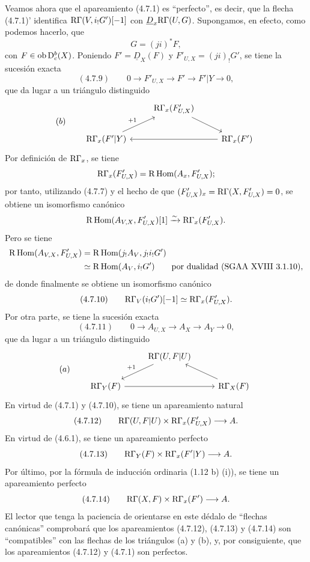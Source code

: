 Veamos ahora que el apareamiento (4.7.1) es \textquotedblleft perfecto\textquotedblright{}, es decir, que la flecha (4.7.1)' identifica $\mathrm{R}\Gamma(V,i_!G')[-1]$ con $\underline{D}_x\mathrm{R}\Gamma(U,G)$. Supongamos, en efecto, como podemos hacerlo, que
\[
G=(ji)^*F,
\]
con $F\in\operatorname{ob}\mathrm{D}_c^b(X)$. Poniendo $F'=\underline{D}_X(F)$ y $F'_{U,X}=(ji)_!G'$, se tiene la sucesión exacta
\[
(4.7.9)\qquad 0\longrightarrow F'_{U,X}\longrightarrow F'\longrightarrow F'|Y\longrightarrow0,
\]
que da lugar a un triángulo distinguido
\[
(b)\qquad
\begin{tikzcd}
& \R\Gamma_x(F'_{U,X}) \arrow[dr] \\
\R\Gamma_x(F'|Y) \arrow[ur,"{+1}"] && \R\Gamma_x(F') \arrow[ll]
\end{tikzcd}
\]
Por definición de $\mathrm{R}\Gamma_x$, se tiene
\[
\mathrm{R}\Gamma_x(F'_{U,X})=\mathrm{R}\operatorname{Hom}(A_x,F'_{U,X});
\]
por tanto, utilizando (4.7.7) y el hecho de que $(F'_{U,X})_x=\mathrm{R}\Gamma(X,F'_{U,X})=0$, se obtiene un isomorfismo canónico
\[
\mathrm{R}\operatorname{Hom}(A_{V,X},F'_{U,X})[1]\xrightarrow{\sim}\mathrm{R}\Gamma_x(F'_{U,X}).
\]
Pero se tiene
\[
\begin{aligned}
\mathrm{R}\operatorname{Hom}(A_{V,X},F'_{U,X})&=\mathrm{R}\operatorname{Hom}(j_!A_V,j_!i_!G')\\
&\simeq\mathrm{R}\operatorname{Hom}(A_V,i_!G')\qquad\text{por dualidad (SGAA~XVIII~3.1.10)},
\end{aligned}
\]
de donde finalmente se obtiene un isomorfismo canónico
\[
(4.7.10)\qquad \mathrm{R}\Gamma_V(i_!G')[-1]\simeq\mathrm{R}\Gamma_x(F'_{U,X}).
\]
Por otra parte, se tiene la sucesión exacta
\[
(4.7.11)\qquad 0\longrightarrow A_{U,X}\longrightarrow A_X\longrightarrow A_Y\longrightarrow0,
\]
que da lugar a un triángulo distinguido
\[
(a)\qquad
\begin{tikzcd}
& \R\Gamma(U,F|U) \arrow[dl,"{+1}"'] \\
\R\Gamma_Y(F) \arrow[rr] && \R\Gamma_X(F) \arrow[ul]
\end{tikzcd}
\]
En virtud de (4.7.1) y (4.7.10), se tiene un apareamiento natural
\[
(4.7.12)\qquad \mathrm{R}\Gamma(U,F|U)\times\mathrm{R}\Gamma_x(F'_{U,X})\longrightarrow A.
\]
En virtud de (4.6.1), se tiene un apareamiento perfecto
\[
(4.7.13)\qquad \mathrm{R}\Gamma_Y(F)\times\mathrm{R}\Gamma_x(F'|Y)\longrightarrow A.
\]
Por último, por la fórmula de inducción ordinaria (1.12 b) (i)), se tiene un apareamiento perfecto
\[
(4.7.14)\qquad \mathrm{R}\Gamma(X,F)\times\mathrm{R}\Gamma_x(F')\longrightarrow A.
\]
El lector que tenga la paciencia de orientarse en este dédalo de \textquotedblleft flechas canónicas\textquotedblright{} comprobará que los apareamientos (4.7.12), (4.7.13) y (4.7.14) son \textquotedblleft compatibles\textquotedblright{} con las flechas de los triángulos (a) y (b), y, por consiguiente, que los apareamientos (4.7.12) y (4.7.1) son perfectos.

